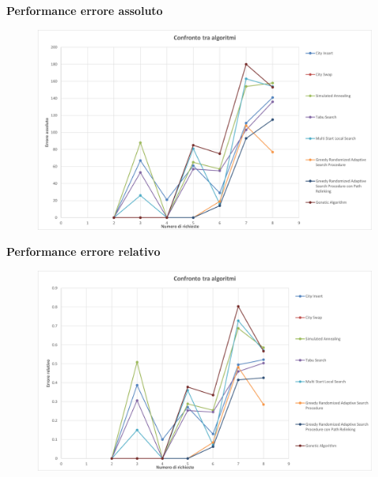 \documentclass[9pt]{beamer}
\begin{document}
\begin{frame}[allowframebreaks]{\subsecname}
	\textbf{Performance errore assoluto}
      	\begin{figure}[h]
	\centering
	\includegraphics[width=\textwidth]
	{../charts/20c Confronto tra algoritmi}
	\end{figure}

\framebreak

	\textbf{Performance errore relativo}
      	\begin{figure}[h]
	\centering
	\includegraphics[width=\textwidth]
	{../charts/20d Confronto tra algoritmi}
	\end{figure}

\end{frame}
\end{document}
